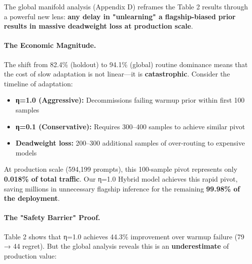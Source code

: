 The global manifold analysis (Appendix D) reframes the Table 2 results through a powerful new lens: \textbf{any delay in "unlearning" a flagship-biased prior results in massive deadweight loss at production scale}.

\paragraph{The Economic Magnitude.}
The shift from 82.4\% (holdout) to 94.1\% (global) routine dominance means that the cost of slow adaptation is not linear—it is \textbf{catastrophic}. Consider the timeline of adaptation:

\begin{itemize}[leftmargin=*,nosep]
    \item \textbf{η=1.0 (Aggressive):} Decommissions failing warmup prior within first 100 samples
    \item \textbf{η=0.1 (Conservative):} Requires 300--400 samples to achieve similar pivot
    \item \textbf{Deadweight loss:} 200--300 additional samples of over-routing to expensive models
\end{itemize}

At production scale (594,199 prompts), this 100-sample pivot represents only \textbf{0.018\% of total traffic}. Our η=1.0 Hybrid model achieves this rapid pivot, saving millions in unnecessary flagship inference for the remaining \textbf{99.98\% of the deployment}.

\paragraph{The "Safety Barrier" Proof.}
Table 2 shows that η=1.0 achieves 44.3\% improvement over warmup failure (79 → 44 regret). But the global analysis reveals this is an \textbf{underestimate} of production value:

